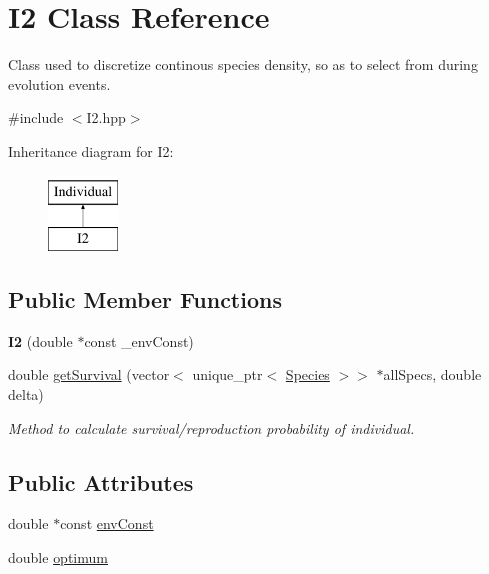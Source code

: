 \hypertarget{classI2}{}\section{I2 Class Reference}
\label{classI2}


Class used to discretize continous species density, so as to select from during evolution events.  




{\ttfamily \#include $<$I2.\+hpp$>$}

Inheritance diagram for I2\+:\begin{figure}[H]
\begin{center}
\leavevmode
\includegraphics[height=2.000000cm]{classI2}
\end{center}
\end{figure}
\subsection*{Public Member Functions}
\begin{DoxyCompactItemize}
\item 
\hypertarget{classI2_a6b6f833683560c884852c507d489d99e}{}\label{classI2_a6b6f833683560c884852c507d489d99e} 
{\bfseries I2} (double $\ast$const \+\_\+env\+Const)
\item 
double \hyperlink{classI2_ac747249e352a954b96a530537c60d3b1}{get\+Survival} (vector$<$ unique\+\_\+ptr$<$ \hyperlink{classSpecies}{Species} $>$$>$ $\ast$all\+Specs, double delta)
\begin{DoxyCompactList}\small\item\em Method to calculate survival/reproduction probability of individual. \end{DoxyCompactList}\end{DoxyCompactItemize}
\subsection*{Public Attributes}
\begin{DoxyCompactItemize}
\item 
double $\ast$const \hyperlink{classI2_a16f94b60e5a6c02c67a46500798fd7cf}{env\+Const}
\item 
double \hyperlink{classI2_a5f022bb4d32b5ee96e117b72e17b262a}{optimum}
\end{DoxyCompactItemize}


